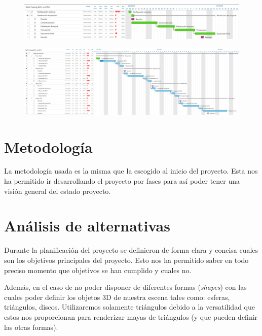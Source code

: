 \documentclass[titlepage,12pt]{article}
\begin{document}
\begin{figure}[H]
	\centering
  	\includegraphics[scale=1.5]{media/final_gantt_1.png}
  	\label{gantt_1}
\end{figure}

\begin{figure}[H]
	\centering
  	\includegraphics[scale=1.25]{media/final_gantt_2.png}
  	\label{gantt_2}
\end{figure}

\useportrait

\section{Metodología}

La metodología usada es la misma que la escogido al inicio del proyecto. Esta nos ha permitido ir desarrollando el proyecto por fases para así poder tener una visión general del estado proyecto.

\section{Análisis de alternativas}

Durante la planificación del proyecto se definieron de forma clara y concisa cuales son los objetivos principales del proyecto. Esto nos ha permitido saber en todo preciso momento que objetivos se han cumplido y cuales no.

Además, en el caso de no poder disponer de diferentes formas (\textit{shapes}) con las cuales poder definir los objetos 3D de nuestra escena tales como: esferas, triángulos, discos. Utilizaremos solamente triángulos debido a la versatilidad que estos nos proporcionan para renderizar mayas de triángulos (y que pueden definir las otras formas).
\end{document}
